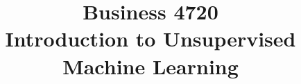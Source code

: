 \documentclass{article}
\title{Business 4720\\ \vspace{\baselineskip}
Introduction to Unsupervised Machine Learning}
\begin{document}
\maketitle

\vfill

\clearpage


\end{document}
